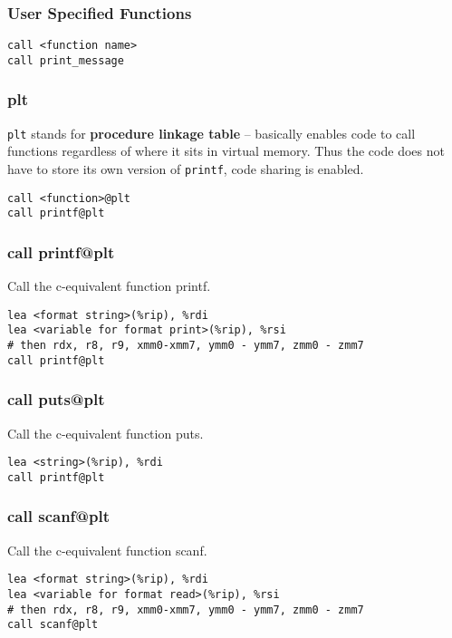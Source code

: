 \documentclass[reqno,a4paper,11pt]{amsart}
\begin{document}
\subsubsection{User Specified Functions}
\begin{lstlisting}
call <function name>
call print_message
\end{lstlisting}
\subsubsection{plt}
\texttt{plt} stands for \textbf{procedure linkage table} -- basically enables
code to call functions regardless of where it sits in virtual memory. Thus the
code does not have to store its own version of \texttt{printf}, code sharing is
enabled.
\begin{lstlisting}
call <function>@plt
call printf@plt
\end{lstlisting}
\subsubsection{call printf@plt}
Call the c-equivalent function printf.
\begin{lstlisting}
lea <format string>(%rip), %rdi
lea <variable for format print>(%rip), %rsi
# then rdx, r8, r9, xmm0-xmm7, ymm0 - ymm7, zmm0 - zmm7
call printf@plt
\end{lstlisting}
\subsubsection{call puts@plt}
Call the c-equivalent function puts.
\begin{lstlisting}
lea <string>(%rip), %rdi
call printf@plt
\end{lstlisting}
\subsubsection{call scanf@plt}
Call the c-equivalent function scanf.
\begin{lstlisting}
lea <format string>(%rip), %rdi
lea <variable for format read>(%rip), %rsi
# then rdx, r8, r9, xmm0-xmm7, ymm0 - ymm7, zmm0 - zmm7
call scanf@plt
\end{lstlisting}
\end{document}
